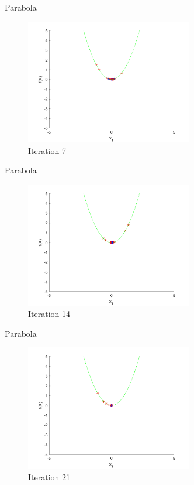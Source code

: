 \documentclass[xcolor=table]{beamer}
\begin{document}
\begin{frame}{Parabola}
  \begin{figure}[h]
  \begin{center}
    \includegraphics[width=0.65\textwidth]{img/smpl/circ/loa-iter-7}
    \caption{Iteration 7}
  \end{center}
  \end{figure}
\end{frame}
\begin{frame}{Parabola}
  \begin{figure}[h]
  \begin{center}
    \includegraphics[width=0.65\textwidth]{img/smpl/circ/loa-iter-14}
    \caption{Iteration 14}
  \end{center}
  \end{figure}
\end{frame}
\begin{frame}{Parabola}
  \begin{figure}[h]
  \begin{center}
    \includegraphics[width=0.65\textwidth]{img/smpl/circ/loa-iter-21}
    \caption{Iteration 21}
  \end{center}
  \end{figure}
\end{frame}
\end{document}
